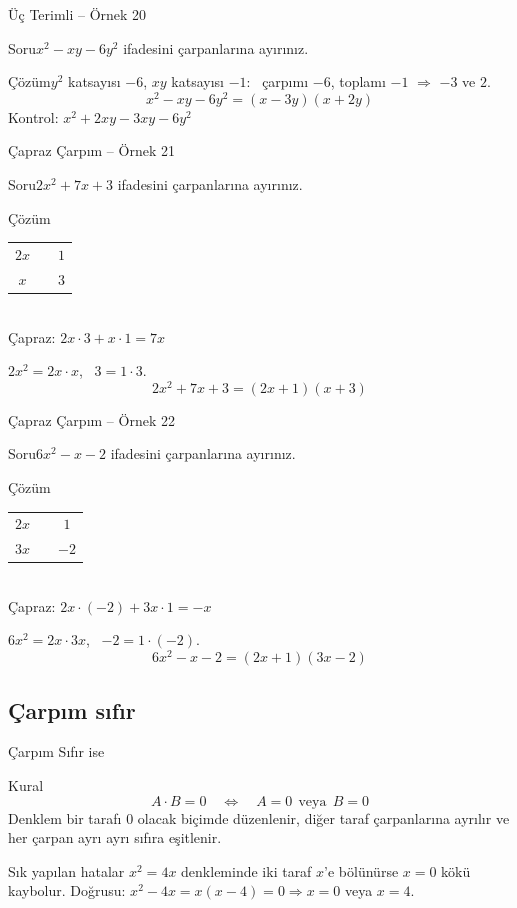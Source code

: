 \documentclass[aspectratio=169,11pt]{beamer}
\newcommand{\soru}[3]{%
\begin{frame}{#1}
  \begin{block}{Soru}\large #2\end{block}
  \pause
  \begin{exampleblock}{Çözüm}\large #3\end{exampleblock}
\end{frame}}
\begin{document}
\soru{Üç Terimli -- Örnek 20}
{\(x^2-xy-6y^2\) ifadesini çarpanlarına ayırınız.}
{\(y^2\) katsayısı \(-6\), \(xy\) katsayısı \(-1\): \ çarpımı \(-6\), toplamı \(-1\) \(\Rightarrow\) \(-3\) ve \(2\).
\[x^2-xy-6y^2=(x-3y)(x+2y)\]
Kontrol: \(x^2+2xy-3xy-6y^2\) \checkmark}

\soru{Çapraz Çarpım -- Örnek 21}
{\(2x^2+7x+3\) ifadesini çarpanlarına ayırınız.}
{\begin{minipage}[t]{0.32\linewidth}
\begin{tabular}{ccc}
\(2x\) & & \(1\)\\
\(x\) & & \(3\)
\end{tabular}\\[4pt]
\normalsize Çapraz: \(2x\cdot 3+x\cdot 1=7x\) \checkmark
\end{minipage}\hfill
\begin{minipage}[t]{0.6\linewidth}
\(2x^2=2x\cdot x\), \ \(3=1\cdot 3\).
\[2x^2+7x+3=(2x+1)(x+3)\]
\end{minipage}}

\soru{Çapraz Çarpım -- Örnek 22}
{\(6x^2-x-2\) ifadesini çarpanlarına ayırınız.}
{\begin{minipage}[t]{0.32\linewidth}
\begin{tabular}{ccc}
\(2x\) & & \(1\)\\
\(3x\) & & \(-2\)
\end{tabular}\\[4pt]
\normalsize Çapraz: \(2x\cdot(-2)+3x\cdot 1=-x\) \checkmark
\end{minipage}\hfill
\begin{minipage}[t]{0.6\linewidth}
\(6x^2=2x\cdot 3x\), \ \(-2=1\cdot(-2)\).
\[6x^2-x-2=(2x+1)(3x-2)\]
\end{minipage}}

\subsection{Çarpım sıfır}
\begin{frame}{Çarpım Sıfır ise}
\begin{block}{Kural}
\[A\cdot B=0\quad\Longleftrightarrow\quad A=0\ \ \text{veya}\ \ B=0\]
Denklem bir tarafı \(0\) olacak biçimde düzenlenir, diğer taraf çarpanlarına ayrılır ve her çarpan ayrı ayrı sıfıra eşitlenir.
\end{block}
\begin{alertblock}{Sık yapılan hatalar}
\(x^2=4x\) denkleminde iki taraf \(x\)'e bölünürse \(x=0\) kökü kaybolur. Doğrusu: \(x^2-4x=x(x-4)=0\Rightarrow x=0\) veya \(x=4\).
\end{alertblock}
\end{frame}
\end{document}
